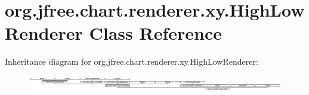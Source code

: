 \hypertarget{classorg_1_1jfree_1_1chart_1_1renderer_1_1xy_1_1_high_low_renderer}{}\section{org.\+jfree.\+chart.\+renderer.\+xy.\+High\+Low\+Renderer Class Reference}
\label{classorg_1_1jfree_1_1chart_1_1renderer_1_1xy_1_1_high_low_renderer}
Inheritance diagram for org.\+jfree.\+chart.\+renderer.\+xy.\+High\+Low\+Renderer\+:\begin{figure}[H]
\begin{center}
\leavevmode
\includegraphics[height=0.706625cm]{classorg_1_1jfree_1_1chart_1_1renderer_1_1xy_1_1_high_low_renderer}
\end{center}
\end{figure}
